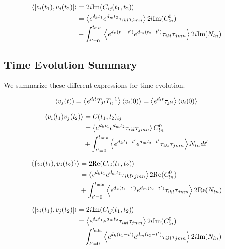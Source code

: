 \documentclass[12pt]{article}
\begin{document}
\begin{align}
\Braket{[v_i(t_1),v_j(t_2)]} &= 2i \text{Im}(C_{ij}(t_1,t_2))\\
&= \Braket{e^{d_k t_1} e^{d_m t_2} \tau_{ikl}\tau_{jmn}}2i\text{Im}(C^0_{ln})\\ 
&+ \int_{t'=0}^{t_{\text{min}}}  \Braket{e^{d_k (t_1-t')} e^{d_m (t_2-t')} \tau_{ikl}\tau_{jmn}}2i\text{Im}(N_{ln})
\end{align}

\subsection{Time Evolution Summary}
We summarize these different expressions for time evolution.

\begin{align}
\braket{v_j(t)} = \Braket{e^{d_l t}T_{jl}T^{-1}_{li}}\Braket{v_i(0)} = \Braket{e^{d_l t} \tau_{jli}} \Braket{v_i(0)}
\end{align}

\begin{align}
\Braket{v_i(t_1)v_j(t_2)} &= C(t_1,t_2)_{ij}\\
&= \Braket{e^{d_k t_1}e^{d_m t_2} \tau_{ikl}\tau_{jmn}} C^0_{ln}\\ &+\int_{t'=0}^{t_{\text{min}}}\Braket{e^{d_k t_1-t'}e^{d_m t_2-t'} \tau_{ikl}\tau_{jmn}} N_{ln} dt'
\end{align}

\begin{align}
\Braket{\{v_i(t_1),v_j(t_2)\}} &= 2 \text{Re}(C_{ij}(t_1,t_2))\\
&= \Braket{e^{d_k t_1} e^{d_m t_2} \tau_{ikl}\tau_{jmn}}2\text{Re}(C^0_{ln})\\ 
&+ \int_{t'=0}^{t_{\text{min}}}  \Braket{e^{d_k (t_1-t')} e^{d_m (t_2-t')} \tau_{ikl}\tau_{jmn}}2\text{Re}(N_{ln})
\end{align}

\begin{align}
\Braket{[v_i(t_1),v_j(t_2)]} &= 2i \text{Im}(C_{ij}(t_1,t_2))\\
&= \Braket{e^{d_k t_1} e^{d_m t_2} \tau_{ikl}\tau_{jmn}}2i\text{Im}(C^0_{ln})\\ 
&+ \int_{t'=0}^{t_{\text{min}}}  \Braket{e^{d_k (t_1-t')} e^{d_m (t_2-t')} \tau_{ikl}\tau_{jmn}}2i\text{Im}(N_{ln})
\end{align}
\end{document}
